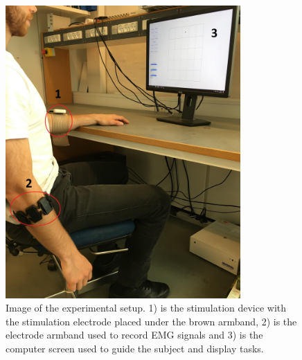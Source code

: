 \begin{figure}[H]                 
	\includegraphics[width=0.8\textwidth]{figures/setupimg}  
	\caption{Image of the experimental setup. 1) is the stimulation device with the stimulation electrode placed under the brown armband, 2) is the electrode armband used to record EMG signals and 3) is the computer screen used to guide the subject and display tasks.} 
	\label{fig:meth:setup} 
\end{figure}